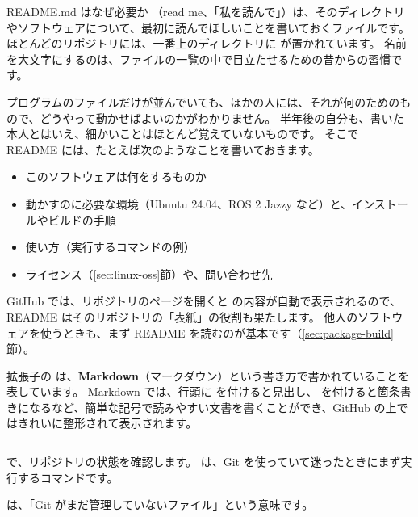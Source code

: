\begin{column}{README.md はなぜ必要か}
  （read me、「私を読んで」）は、そのディレクトリやソフトウェアについて、最初に読んでほしいことを書いておくファイルです。
  ほとんどのリポジトリには、一番上のディレクトリに  が置かれています。
  名前を大文字にするのは、ファイルの一覧の中で目立たせるための昔からの習慣です。

  プログラムのファイルだけが並んでいても、ほかの人には、それが何のためのもので、どうやって動かせばよいのかがわかりません。
  半年後の自分も、書いた本人とはいえ、細かいことはほとんど覚えていないものです。
  そこで README には、たとえば次のようなことを書いておきます。
  \begin{itemize}
    \item このソフトウェアは何をするものか
    \item 動かすのに必要な環境（Ubuntu 24.04、ROS 2 Jazzy など）と、インストールやビルドの手順
    \item 使い方（実行するコマンドの例）
    \item ライセンス（\ref{sec:linux-oss}節）や、問い合わせ先
  \end{itemize}
  GitHub では、リポジトリのページを開くと  の内容が自動で表示されるので、README はそのリポジトリの「表紙」の役割も果たします。
  他人のソフトウェアを使うときも、まず README を読むのが基本です（\ref{sec:package-build}節）。

  拡張子の  は、\textbf{Markdown}（マークダウン）という書き方で書かれていることを表しています。
  Markdown では、行頭に \cmd{\#} を付けると見出し、\cmd{-} を付けると箇条書きになるなど、簡単な記号で読みやすい文書を書くことができ、GitHub の上ではきれいに整形されて表示されます。
\end{column}

 で、リポジトリの状態を確認します。
 は、Git を使っていて迷ったときにまず実行するコマンドです。


 は、「Git がまだ管理していないファイル」という意味です。

